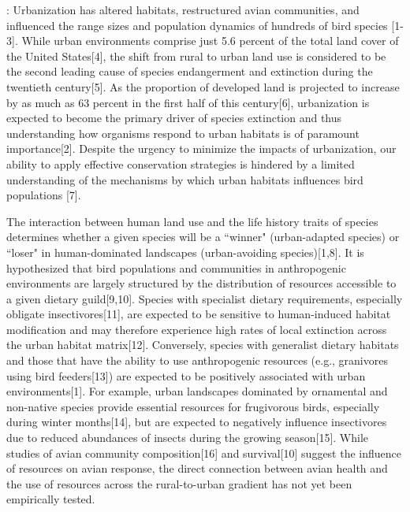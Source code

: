 \documentclass[12pt]{article}
\date{}
\begin{document}
\maketitle \vspace{-2cm}


\doublespace
{}: Urbanization has altered habitats, restructured avian communities, and influenced the range sizes and population dynamics of hundreds of bird species [1-3]. While urban environments comprise just 5.6 percent of the total land cover of the United States[4], the shift from rural to urban land use is considered to be the second leading cause of species endangerment and extinction during the twentieth century[5]. As the proportion of developed land is projected to increase by as much as 63 percent in the first half of this century[6], urbanization is expected to become the primary driver of species extinction and thus understanding how organisms respond to urban habitats is of paramount importance[2]. Despite the urgency to minimize the impacts of urbanization, our ability to apply effective conservation strategies is hindered by a limited understanding of the mechanisms by which urban habitats influences bird populations [7]. \par

The interaction between human land use and the life history traits of species determines whether a given species will be a ``winner" (urban-adapted species) or ``loser" in human-dominated landscapes (urban-avoiding species)[1,8]. It is hypothesized that bird populations and communities in anthropogenic environments are largely structured by the distribution of resources accessible to a given dietary guild[9,10]. Species with specialist dietary requirements, especially obligate insectivores[11], are expected to be sensitive to human-induced habitat modification and may therefore experience high rates of local extinction across the urban habitat matrix[12]. Conversely, species with generalist dietary habitats and those that have the ability to use anthropogenic resources (e.g., granivores using bird feeders[13]) are expected to be positively associated with urban environments[1]. For example, urban landscapes dominated by ornamental and non-native species provide essential resources for frugivorous birds, especially during winter months[14], but are expected to negatively influence insectivores due to reduced abundances of insects during the growing season[15]. While studies of avian community composition[16] and survival[10] suggest the influence of resources on avian response, the direct connection between avian health and the use of resources across the rural-to-urban gradient has not yet been empirically tested.\par
\end{document}

